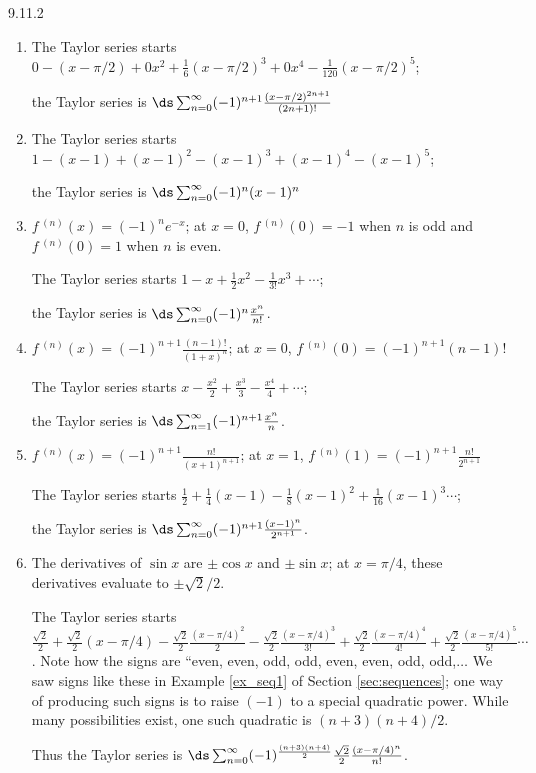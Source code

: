 \begin{Answer}{9.11.2}
\begin{enumerate}
\item
{The Taylor series starts $0-(x-\pi/2)+0x^2+\frac16(x-\pi/2)^3+0x^4-\frac1{120}(x-\pi/2)^5$;

the Taylor series is $\ds \sum_{n=0}^\infty (-1)^{n+1}\frac{(x-\pi/2)^{2n+1}}{(2n+1)!}$
}
\item
{The Taylor series starts $1-(x-1)+(x-1)^2-(x-1)^3+(x-1)^4-(x-1)^5$;

the Taylor series is $\ds \sum_{n=0}^\infty (-1)^{n}(x-1)^n$
}
\item
{$f\,^{(n)}(x) = (-1)^ne^{-x}$; at $x=0$, $f\,^{(n)}(0)=-1$ when $n$ is odd and $f\,^{(n)}(0)=1$ when $n$ is even.

The Taylor series starts $1-x+\frac12x^2-\frac1{3!}x^3+\cdots$;

the Taylor series is $\ds \sum_{n=0}^\infty (-1)^n\frac{x^n}{n!}$.
}
\item
{$f\,^{(n)}(x) = (-1)^{n+1}\frac{(n-1)!}{(1+x)^n}$; at $x=0$, $f\,^{(n)}(0)=(-1)^{n+1}(n-1)!$

The Taylor series starts $x-\frac{x^2}2+\frac{x^3}3-\frac{x^4}4+\cdots$;

the Taylor series is $\ds \sum_{n=1}^\infty (-1)^{n+1}\frac{x^n}{n}$.
}
\item
{$f\,^{(n)}(x) = (-1)^{n+1}\frac{n!}{(x+1)^{n+1}}$; at $x=1$, $f\,^{(n)}(1)=(-1)^{n+1}\frac{n!}{2^{n+1}}$

The Taylor series starts $\frac12+\frac14(x-1)-\frac18(x-1)^2+\frac1{16}(x-1)^3\cdots$;

the Taylor series is $\ds \sum_{n=0}^\infty (-1)^{n+1}\frac{(x-1)^n}{2^{n+1}}$.
}
\item
{The derivatives of $\sin x$ are $\pm \cos x$ and $\pm \sin x$; at $x=\pi/4$, these derivatives evaluate to $\pm \sqrt{2}/2$.

The Taylor series starts $\frac{\sqrt{2}}2+\frac{\sqrt{2}}2(x-\pi/4) - \frac{\sqrt{2}}2\frac{(x-\pi/4)^2}{2}-\frac{\sqrt{2}}2\frac{(x-\pi/4)^3}{3!}+\frac{\sqrt{2}}2\frac{(x-\pi/4)^4}{4!}+\frac{\sqrt{2}}2\frac{(x-\pi/4)^5}{5!}\cdots$. Note how the signs are ``even, even, odd, odd, even, even, odd, odd,$\ldots$ We saw signs like these in Example \ref{ex_seq1} of Section \ref{sec:sequences}; one way of producing such signs is to raise $(-1)$ to a special quadratic power. While many possibilities exist,
one such quadratic is $(n+3)(n+4)/2$.

Thus the Taylor series is $\ds \sum_{n=0}^\infty (-1)^{\frac{(n+3)(n+4)}{2}}\frac{\sqrt2}{2}\frac{(x-\pi/4)^n}{n!}$.
}
\end{enumerate}
\end{Answer}
